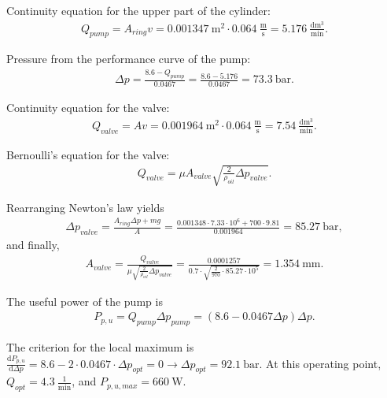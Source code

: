 Continuity equation for the upper part of the cylinder:
\begin{align*}
Q_{pump} = A_{ring}v = 0.001347~\mathrm{m^2}\cdot 0.064~\frac{\mathrm{m}}{\mathrm{s}} = 5.176~\frac{\mathrm{dm^3}}{\mathrm{min}}.
\end{align*}

Pressure from the performance curve of the pump:
\begin{align*}
\Delta p = \frac{8.6-Q_{pump}}{0.0467} = \frac{8.6-5.176}{0.0467} = 73.3~\mathrm{bar}.
\end{align*}

Continuity equation for the valve:
\begin{align*}
Q_{valve} = Av = 0.001964~\mathrm{m^2}\cdot 0.064~\frac{\mathrm{m}}{\mathrm{s}} = 7.54~\frac{\mathrm{dm^3}}{\mathrm{min}}.
\end{align*}

Bernoulli's equation for the valve: 
\begin{align*}
Q_{valve} = \mu A_{valve}\sqrt{\frac{2}{\rho_{oil}}\Delta p_{valve}}.
\end{align*}

Rearranging Newton's law yields
\begin{align*}
\Delta p_{valve} = \frac{A_{ring}\Delta p + mg}{A} = \frac{0.001348\cdot 7.33\cdot 10^6 + 700\cdot 9.81}{0.001964} = 85.27~\mathrm{bar}, 
\end{align*}
and finally,
\begin{align*}
A_{valve} = \frac{Q_{valve}}{\mu \sqrt{\frac{2}{\rho_{oil}}\Delta p_{valve}}} = \frac{0.0001257}{0.7\cdot \sqrt{\frac{2}{970}\cdot 85.27\cdot 10^5}} = 1.354~\mathrm{mm}.
\end{align*}

The useful power of the pump is
\begin{align*}
P_{p,u}=Q_{pump}\Delta p_{pump} = (8.6-0.0467 \Delta p)\Delta p.
\end{align*}

The criterion for the local maximum is $\frac{\mathrm{d}P_{p,u}}{\mathrm{d}\Delta p} = 8.6-2\cdot 0.0467\cdot \Delta p_{opt} = 0 \rightarrow \Delta p_{opt} = 92.1~\mathrm{bar}$. At this operating point, $Q_{opt}=4.3~\frac{1}{\mathrm{min}}$, and $P_{p,u,max} = 660~\mathrm{W}$.
